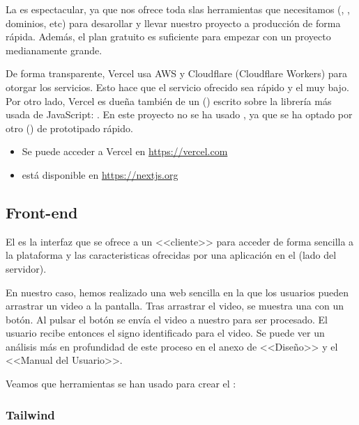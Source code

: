 La  es espectacular, ya que nos ofrece toda slas herramientas que necesitamos (, , dominios, etc) para desarollar y llevar nuestro proyecto a producción de forma rápida. Además, el plan gratuito es suficiente para empezar con un proyecto medianamente grande.

De forma transparente, Vercel usa AWS y Cloudflare (Cloudflare Workers) para otorgar los servicios. Esto hace que el servicio ofrecido sea rápido y el  muy bajo. Por otro lado, Vercel es dueña también de un  () escrito sobre la librería más usada de JavaScript: . En este proyecto no se ha usado , ya que se ha optado por otro  () de prototipado rápido.

\begin{itemize}
  \item Se puede acceder a Vercel en \url{https://vercel.com}
  \item {} está disponible en \url{https://nextjs.org}
\end{itemize}

\subsection{Front-end}

El  es la interfaz que se ofrece a un <<cliente>> para acceder de forma sencilla a la plataforma y las caracteristicas ofrecidas por una aplicación en el  (lado del servidor).

En nuestro caso, hemos realizado una web sencilla en la que los usuarios pueden arrastrar un video a la pantalla. Tras arrastrar el video, se muestra una  con un botón. Al pulsar el botón se envía
el video a nuestro  para ser procesado. El usuario recibe entonces el signo identificado para el video. Se puede ver un análisis más en profundidad de este proceso en el anexo de <<Diseño>> y el <<Manual del Usuario>>.

Veamos que herramientas se han usado para crear el :

\subsubsection{Tailwind}

